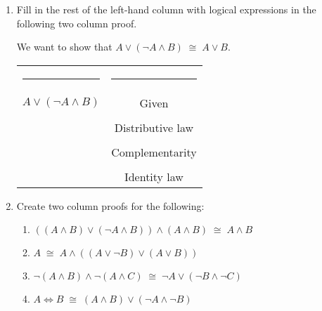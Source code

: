 \documentclass{amsart}
\begin{document}
\begin{enumerate}
\newpage

\item Fill in the rest of the left-hand column with logical expressions in the following two column proof.

We want to show that $ A \lor ({\lnot}A \land B) \; \cong \; A \lor B $.
\vspace{.5in}

\hspace{-1in} \begin{tabular}{c | c}
\rule{2.5in}{0in} & \rule{2.5in}{0in} \\
 $ A \lor ({\lnot}A \land B)$ & Given \\
\rule{0pt}{18pt} & \\
 & Distributive law \\
\rule{0pt}{18pt} & \\
 & Complementarity \\
\rule{0pt}{18pt} & \\
 & Identity law
\end{tabular}

\vspace{.75in}

\item Create two column proofs for the following:

\begin{enumerate}
\item \rule[-8pt]{0pt}{36pt} $((A \land B) \lor  (\lnot A \land B)  ) \land (A \land B) \; \cong \; A \land B $
\item \rule[-8pt]{0pt}{36pt} $A \; \cong \; A \land ((A \lor {\lnot}B) \lor (A \lor B))$
\item \rule[-8pt]{0pt}{36pt} ${\lnot}(A \land B) \land {\lnot}(A \land C) \; \cong \; {\lnot}A \lor ({\lnot}B \land {\lnot}C)$
\item \rule[-8pt]{0pt}{36pt} $ A \iff B \; \cong \; (A \land B) \lor (\lnot A \land \lnot B)$
\end{enumerate}
 
\end{enumerate}
\end{document}

